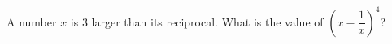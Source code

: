 A number $x$ is $3$ larger than its reciprocal. What is the value of $\left(x-\dfrac{1}{x}\right)^4$?
